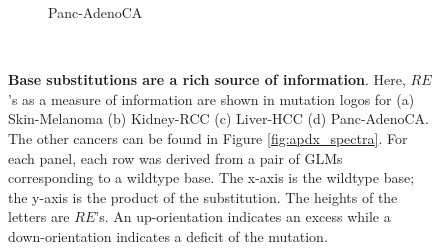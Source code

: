 \begin{figure}[ht!]
\begin{subfigure}{.5\textwidth}
    \caption{Panc-AdenoCA}
    \label{fig:spectra_panc_adenoca}
    \end{subfigure} \\
    \vspace{0.2cm}
    \caption{\textbf{Base substitutions are a rich source of information}. Here, $RE$'s as a measure of information are shown in mutation logos for (a) Skin-Melanoma (b) Kidney-RCC (c) Liver-HCC (d) Panc-AdenoCA. The other cancers can be found in Figure \ref{fig:apdx_spectra}. For each panel, each row was derived from a pair of GLMs corresponding to a wildtype base. The x-axis is the wildtype base; the y-axis is the product of the substitution. The heights of the letters are $RE$'s. An up-orientation indicates an excess while a down-orientation indicates a deficit of the mutation.}
    \label{fig:spectra}
\end{figure}
